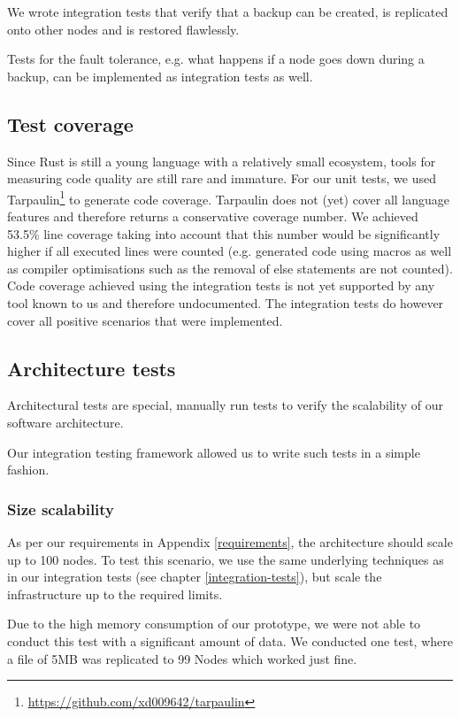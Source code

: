 We wrote integration tests that verify that a backup can be created, is replicated onto other nodes and is restored flawlessly.

Tests for the fault tolerance, e.g. what happens if a node goes down during a backup, can be implemented as integration tests as well.

\subsection{Test coverage}

Since Rust is still a young language with a relatively small ecosystem, tools for measuring code quality are still rare and immature. For our unit tests, we used Tarpaulin\footnote{\url{https://github.com/xd009642/tarpaulin}} to generate code coverage. Tarpaulin does not (yet) cover all language features and therefore returns a conservative coverage number. We achieved 53.5\% line coverage taking into account that this number would be significantly higher if all executed lines were counted (e.g. generated code using macros as well as compiler optimisations such as the removal of else statements are not counted).
Code coverage achieved using the integration tests is not yet supported by any tool known to us and therefore undocumented. The integration tests do however cover all positive scenarios that were implemented.

\subsection{Architecture tests}

Architectural tests are special, manually run tests to verify the scalability of our software architecture.

Our integration testing framework allowed us to write such tests in a simple fashion.

\subsubsection{Size scalability}
As per our requirements in Appendix \ref{requirements}, the architecture should scale up to 100 nodes. To test this scenario, we use the same underlying techniques as in our integration tests (see chapter \ref{integration-tests}), but scale the infrastructure up to the required limits.

Due to the high memory consumption of our prototype, we were not able to conduct this test with a significant amount of data. We conducted one test, where a file of 5MB was replicated to 99 Nodes which worked just fine.

